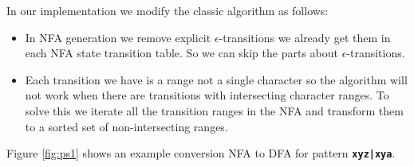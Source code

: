 In our implementation we modify the classic algorithm as follows:
 \begin{itemize}
     \item In NFA generation we remove explicit $\epsilon$-transitions we already get them in each NFA state transition table. So we can skip the parts about $\epsilon$-transitions.
     \item Each transition we have is a range not a single character so the algorithm will not work when there are transitions with intersecting character ranges. To solve this we iterate all the transition ranges in the NFA and transform them to a sorted set of non-intersecting ranges.

 \end{itemize}
 
Figure \ref{fig:ps1} shows an example conversion NFA to DFA for pattern \texttt{\textbf{xyz|xya}}.


